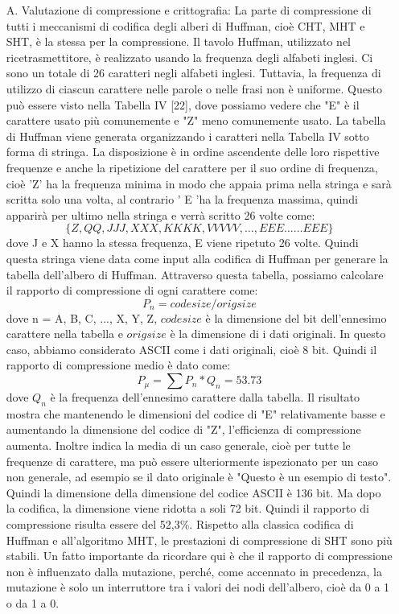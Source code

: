 \documentclass[a4paper]{report} %
\begin{document}
\begin{enumerate}
\item[A.] Valutazione di compressione e crittografia:
La parte di compressione di tutti i meccanismi di codifica degli alberi di Huffman, cioè CHT, MHT e SHT, è la stessa per la compressione. Il tavolo Huffman, utilizzato nel ricetrasmettitore, è realizzato usando la frequenza degli alfabeti inglesi. Ci sono un totale di 26 caratteri negli alfabeti inglesi. Tuttavia, la frequenza di utilizzo di ciascun carattere nelle parole o nelle frasi non è uniforme. Questo può essere visto nella Tabella IV [22], dove possiamo vedere che "E" è il carattere usato più comunemente e "Z" meno comunemente usato. La tabella di Huffman viene generata organizzando i caratteri nella Tabella IV sotto forma di stringa. La disposizione è in ordine ascendente delle loro rispettive frequenze e anche la ripetizione del carattere per il suo ordine di frequenza, cioè 'Z' ha la frequenza minima in modo che appaia prima nella stringa e sarà scritta solo una volta, al contrario ' E 'ha la frequenza massima, quindi apparirà per ultimo nella stringa e verrà scritto 26 volte come:
\begin{equation}
\{Z, QQ, JJJ, XXX, KKKK, VVVVV, \ldots, EEE \ldots \ldots EEE\}
\end{equation}
dove J e X hanno la stessa frequenza, E viene ripetuto 26 volte. Quindi questa stringa viene data come input alla codifica di Huffman per generare la tabella dell'albero di Huffman. Attraverso questa tabella, possiamo calcolare il rapporto di compressione di ogni carattere come:
\begin{equation}
P_{n} = codesize / origsize
\end{equation}
dove n = {A, B, C, ..., X, Y, Z}, $codesize$ è la dimensione del bit dell'ennesimo carattere nella tabella e $origsize$ è la dimensione di i dati originali. In questo caso, abbiamo considerato ASCII come i dati originali, cioè 8 bit. Quindi il rapporto di compressione medio è dato come:
\begin{equation}
P_{\mu} = \sum P_n * Q_n = 53.73%
\end{equation}
dove $Q_n$ è la frequenza dell'ennesimo carattere dalla tabella. Il risultato mostra che mantenendo le dimensioni del codice di "E" relativamente basse e aumentando la dimensione del codice di "Z", l'efficienza di compressione aumenta. Inoltre indica la media di un caso generale, cioè per tutte le frequenze di carattere, ma può essere ulteriormente ispezionato per un caso non generale, ad esempio se il dato originale è "Questo è un esempio di testo". Quindi la dimensione della dimensione del codice ASCII è 136 bit. Ma dopo la codifica, la dimensione viene ridotta a soli 72 bit. Quindi il rapporto di compressione risulta essere del 52,3\%. Rispetto alla classica codifica di Huffman e all'algoritmo MHT, le prestazioni di compressione di SHT sono più stabili. Un fatto importante da ricordare qui è che il rapporto di compressione non è influenzato dalla mutazione, perché, come accennato in precedenza, la mutazione è solo un interruttore tra i valori dei nodi dell'albero, cioè da 0 a 1 o da 1 a 0.

\end{enumerate}
\end{document}
